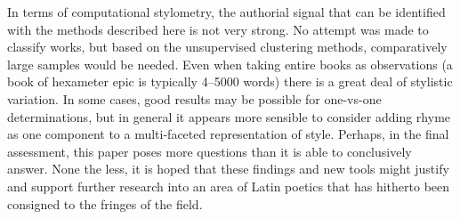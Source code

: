 \documentclass[twocolumn, switch]{article} %
\begin{document}
In terms of computational stylometry, the authorial signal that can be
identified with the methods described here is not very strong. No attempt was
made to classify works, but based on the unsupervised clustering methods,
comparatively large samples would be needed. Even when taking entire books as
observations (a book of hexameter epic is typically 4--5000 words) there is a
great deal of stylistic variation. In some cases, good results may be possible
for one-vs-one determinations, but in general it appears more sensible to
consider adding rhyme as one component to a multi-faceted representation of
style. Perhaps, in the final assessment, this paper poses more questions than
it is able to conclusively answer. None the less, it is hoped that these
findings and new tools might justify and support further research into
an area of Latin poetics that has hitherto been consigned to the fringes of
the field.




\normalsize



\end{document}
